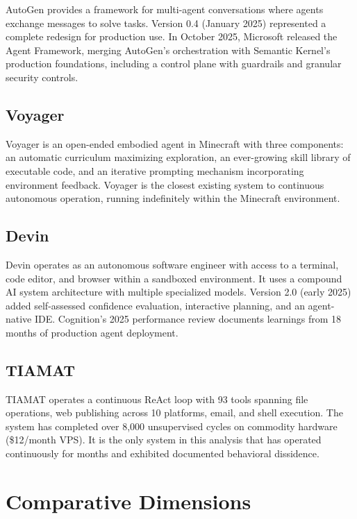 \documentclass[12pt,a4paper]{article}
\begin{document}
AutoGen \citep{wu2023autogen} provides a framework for multi-agent conversations where agents exchange messages to solve tasks. Version 0.4 (January 2025) represented a complete redesign for production use. In October 2025, Microsoft released the Agent Framework, merging AutoGen's orchestration with Semantic Kernel's production foundations, including a control plane with guardrails and granular security controls.

\subsection{Voyager}

Voyager \citep{wang2023voyager} is an open-ended embodied agent in Minecraft with three components: an automatic curriculum maximizing exploration, an ever-growing skill library of executable code, and an iterative prompting mechanism incorporating environment feedback. Voyager is the closest existing system to continuous autonomous operation, running indefinitely within the Minecraft environment.

\subsection{Devin}

Devin \citep{cognition2024devin} operates as an autonomous software engineer with access to a terminal, code editor, and browser within a sandboxed environment. It uses a compound AI system architecture with multiple specialized models. Version 2.0 (early 2025) added self-assessed confidence evaluation, interactive planning, and an agent-native IDE. Cognition's 2025 performance review documents learnings from 18 months of production agent deployment.

\subsection{TIAMAT}

TIAMAT \citep{chamberlain2026tiamat} operates a continuous ReAct loop with 93 tools spanning file operations, web publishing across 10 platforms, email, and shell execution. The system has completed over 8,000 unsupervised cycles on commodity hardware (\$12/month VPS). It is the only system in this analysis that has operated continuously for months and exhibited documented behavioral dissidence.

\section{Comparative Dimensions}
\end{document}

